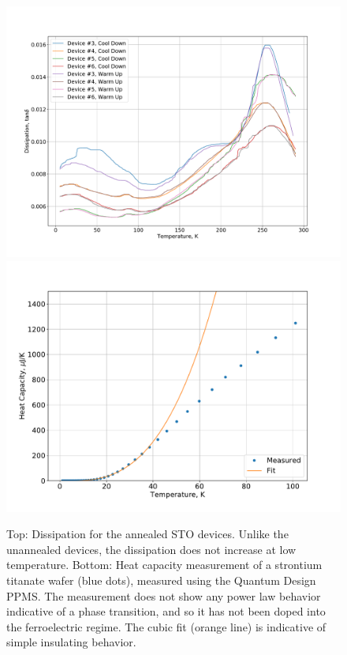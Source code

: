 \documentclass{thesis-umich}
\begin{document}
\begin{figure} \caption[Annealed STO thermometer dissipation]{Top: Dissipation for the annealed STO devices. Unlike
	the unannealed devices, the dissipation does not increase at low
temperature. Bottom: Heat capacity measurement of a strontium titanate wafer
(blue dots), measured using the Quantum Design PPMS. The measurement does not
show any power law behavior indicative of a phase transition, and so it has not
been doped into the ferroelectric regime. The cubic fit (orange line) is
indicative of simple insulating behavior.}
\includegraphics[width=0.9\columnwidth]{figures/annealed_sto_diss_vs_t.pdf}
\includegraphics[width=0.9\columnwidth]{figures/annealed_sto_heatcap_vs_t.pdf}
\end{figure}
\end{document}
